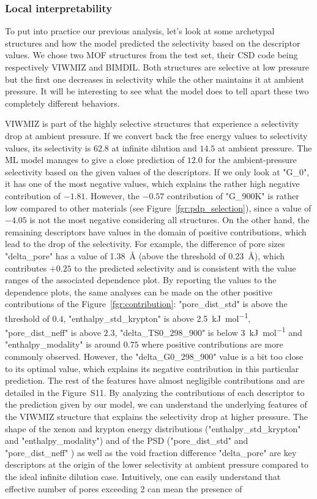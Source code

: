 \documentclass[main]{subfiles}
\begin{document}
\subsubsection{Local interpretability}

To put into practice our previous analysis, let's look at some archetypal structures and how the model predicted the selectivity based on the descriptor values. We chose two MOF structures from the test set, their CSD code being respectively VIWMIZ and BIMDIL. Both structures are selective at low pressure but the first one decreases in selectivity while the other maintains it at ambient pressure. It will be interesting to see what the model does to tell apart these two completely different behaviors.

VIWMIZ is part of the highly selective structures that experience a selectivity drop at ambient pressure. If we convert back the free energy values to selectivity values, its selectivity is $62.8$ at infinite dilution and $14.5$ at ambient pressure. The ML model manages to give a close prediction of $12.0$ for the ambient-pressure selectivity based on the given values of the descriptors. If we only look at "G\_0", it has one of the most negative values, which explains the rather high negative contribution of $-1.81$. However, the $-0.57$ contribution of "G\_900K" is rather low compared to other materials (see Figure~\ref{fgr:pdp_selection}), since a value of $-4.05$ is not the most negative considering all structures. On the other hand, the remaining descriptors have values in the domain of positive contributions, which lead to the drop of the selectivity. For example, the difference of pore sizes "delta\_pore" has a value of \SI{1.38}{\angstrom} (above the threshold of \SI{0.23}{\angstrom}), which contributes $+0.25$ to the predicted selectivity and is consistent with the value ranges of the associated dependence plot. By reporting the values to the dependence plots, the same analyses can be made on the other positive contributions of the Figure~\ref{fgr:contribution}: "pore\_dist\_std" is above the threshold of $0.4$, "enthalpy\_std\_krypton" is above \SI{2.5}{\kilo\joule\per\mole}, "pore\_dist\_neff" is above $2.3$, "delta\_TS0\_298\_900" is below \SI{3}{\kilo\joule\per\mole} and "enthalpy\_modality" is around $0.75$ where positive contributions are more commonly observed. However, the "delta\_G0\_298\_900" value is a bit too close to its optimal value, which explains its negative contribution in this particular prediction. The rest of the features have almost negligible contributions and are detailed in the Figure~S11. By analyzing the contributions of each descriptor to the prediction given by our model, we can understand the underlying features of the VIWMIZ structure that explains the selectivity drop at higher pressure. The shape of the xenon and krypton energy distributions ("enthalpy\_std\_krypton" and "enthalpy\_modality") and of the PSD ("pore\_dist\_std" and "pore\_dist\_neff" ) as well as the void fraction difference "delta\_pore" are key descriptors at the origin of the lower selectivity at ambient pressure compared to the ideal infinite dilution case. Intuitively, one can easily understand that effective number of pores exceeding 2 can mean the presence of 
\end{document}
